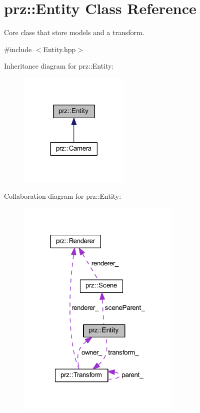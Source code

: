 \hypertarget{classprz_1_1_entity}{}\section{prz\+::Entity Class Reference}
\label{classprz_1_1_entity}


Core class that store models and a transform.  




{\ttfamily \#include $<$Entity.\+hpp$>$}



Inheritance diagram for prz\+::Entity\+:
\nopagebreak
\begin{figure}[H]
\begin{center}
\leavevmode
\includegraphics[width=150pt]{classprz_1_1_entity__inherit__graph}
\end{center}
\end{figure}


Collaboration diagram for prz\+::Entity\+:
\nopagebreak
\begin{figure}[H]
\begin{center}
\leavevmode
\includegraphics[width=223pt]{classprz_1_1_entity__coll__graph}
\end{center}
\end{figure}
